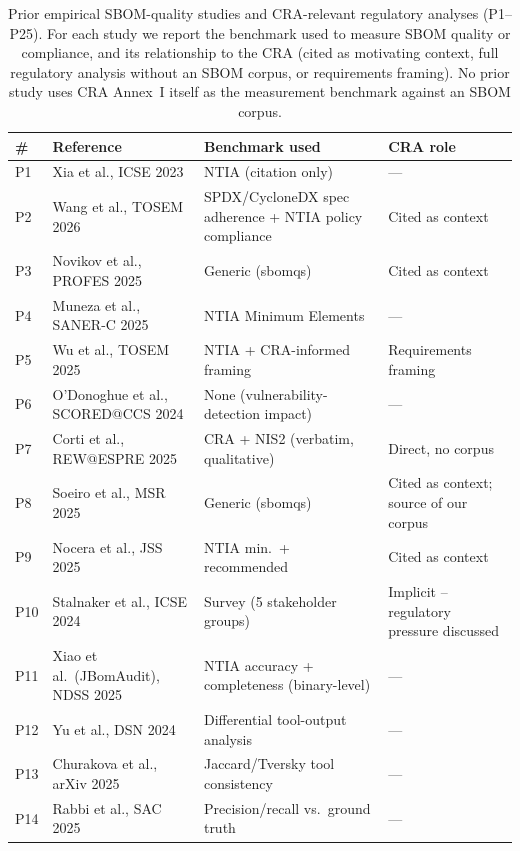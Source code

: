\begin{table}[t]
\centering
\caption{Prior empirical SBOM-quality studies and CRA-relevant regulatory analyses (P1--P25). For each study we report the benchmark used to measure SBOM quality or compliance, and its relationship to the CRA (cited as motivating context, full regulatory analysis without an SBOM corpus, or requirements framing). No prior study uses CRA Annex~I itself as the measurement benchmark against an SBOM corpus.}
\label{tab:related-work}
\scriptsize
\begin{tabular}{p{}p{}p{}p{}}
\toprule
\# & Reference & Benchmark used & CRA role \\
\midrule
P1 & Xia et al., ICSE 2023 \cite{xia2023} & NTIA (citation only) & --- \\
P2 & Wang et al., TOSEM 2026 \cite{wang2026} & SPDX/CycloneDX spec adherence + NTIA policy compliance & Cited as context \\
P3 & Novikov et al., PROFES 2025 \cite{novikov2025} & Generic (sbomqs) & Cited as context \\
P4 & Muneza et al., SANER-C 2025 \cite{muneza2025} & NTIA Minimum Elements & --- \\
P5 & Wu et al., TOSEM 2025 \cite{wu2025} & NTIA + CRA-informed framing & Requirements framing \\
P6 & O'Donoghue et al., SCORED@CCS 2024 \cite{odonoghue2024} & None (vulnerability-detection impact) & --- \\
P7 & Corti et al., REW@ESPRE 2025 \cite{corti2025} & CRA + NIS2 (verbatim, qualitative) & Direct, no corpus \\
P8 & Soeiro et al., MSR 2025 \cite{soeiro2025} & Generic (sbomqs) & Cited as context; source of our corpus \\
P9 & Nocera et al., JSS 2025 \cite{nocera2025jss} & NTIA min.\ + recommended & Cited as context \\
P10 & Stalnaker et al., ICSE 2024 \cite{stalnaker2024} & Survey (5 stakeholder groups) & Implicit -- regulatory pressure discussed \\
P11 & Xiao et al.\ (JBomAudit), NDSS 2025 \cite{jbomaudit} & NTIA accuracy + completeness (binary-level) & --- \\
P12 & Yu et al., DSN 2024 \cite{yu2024} & Differential tool-output analysis & --- \\
P13 & Churakova et al., arXiv 2025 \cite{churakova2025} & Jaccard/Tversky tool consistency & --- \\
P14 & Rabbi et al., SAC 2025 \cite{rabbi2025} & Precision/recall vs.\ ground truth & --- \\

\end{tabular}
\end{table}
